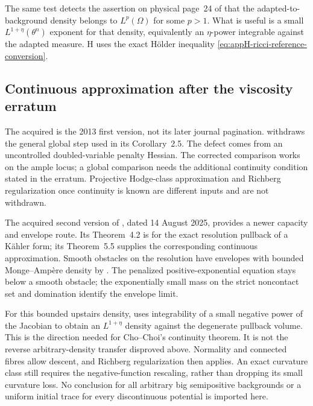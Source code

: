 The same test detects the assertion on physical page~24
of \cite{GKSS25HolderV1} that the adapted-to-background
density belongs to \(L^p(\Omega)\) for some \(p>1\).
What is useful is a small \(L^{1+\eta}(\theta^n)\)
exponent for that density, equivalently an \(\eta\)-power
integrable against the adapted measure. H uses the exact
H\"older inequality
\eqref{eq:appH-ricci-reference-conversion}.

\subsection{Continuous approximation after the viscosity erratum}

The acquired \cite{EGZ13ContinuousApproximationV1} is the
2013 first version, not its later journal pagination.
\cite[Section~2.2]{EGZ16ViscosityErratumV1} withdraws the
general global step used in its Corollary~2.5. The defect
comes from an uncontrolled doubled-variable penalty
Hessian. The corrected comparison works on the ample
locus; a global comparison needs the additional continuity
condition stated in the erratum. Projective Hodge-class
approximation and Richberg regularization once continuity
is known are different inputs and are not withdrawn.

The acquired second version of
\cite{ChoChoi25ContinuityV2}, dated 14 August 2025,
provides a newer capacity and envelope route. Its
Theorem~4.2 is for the exact resolution pullback of a
K\"ahler form; its Theorem~5.5 supplies the corresponding
continuous approximation. Smooth obstacles on the resolution
have envelopes with bounded Monge--Amp\`ere density by
\cite[Theorem~3.5]{GLZ17EnvelopesV1}. The penalized
positive-exponential equation stays below a smooth obstacle;
the exponentially small mass on the strict noncontact set
and domination identify the envelope limit.

For this bounded upstairs density,
\cite[Lemma~3.2]{EGZ08SingularKEV2} uses integrability of
a small negative power of the Jacobian to obtain an
\(L^{1+\eta}\) density against the degenerate pullback
volume. This is the direction needed for Cho--Choi's
continuity theorem. It is not the reverse arbitrary-density
transfer disproved above. Normality and connected fibres
allow descent, and Richberg regularization then applies.
An exact curvature class still requires the negative-function
rescaling, rather than dropping its small curvature loss.
No conclusion for all arbitrary big semipositive backgrounds
or a uniform initial trace for every discontinuous potential
is imported here.


